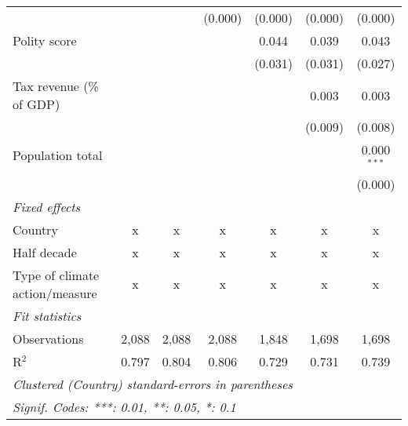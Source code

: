 \begin{tabular}{lcccccc}
                                                                         &              &                & (0.000)        & (0.000)        & (0.000)        & (0.000)\\   
   Polity score                                                          &              &                &                & 0.044          & 0.039          & 0.043\\   
                                                                         &              &                &                & (0.031)        & (0.031)        & (0.027)\\   
   Tax revenue (\% of GDP)                                               &              &                &                &                & 0.003          & 0.003\\   
                                                                         &              &                &                &                & (0.009)        & (0.008)\\   
   Population total                                                      &              &                &                &                &                & 0.000$^{***}$\\   
                                                                         &              &                &                &                &                & (0.000)\\   
   \emph{Fixed effects}\\
   Country                                                               & x            & x              & x              & x              & x              & x\\  
   Half decade                                                           & x            & x              & x              & x              & x              & x\\  
   Type of climate action/measure                                        & x            & x              & x              & x              & x              & x\\  
   \midrule \emph{Fit statistics}\\
   Observations                                                          & 2,088        & 2,088          & 2,088          & 1,848          & 1,698          & 1,698\\  
   R$^2$                                                                 & 0.797        & 0.804          & 0.806          & 0.729          & 0.731          & 0.739\\  
   \midrule
   \multicolumn{7}{l}{\emph{Clustered (Country) standard-errors in parentheses}}\\
   \multicolumn{7}{l}{\emph{Signif. Codes: ***: 0.01, **: 0.05, *: 0.1}}\\
\end{tabular}
\par\endgroup


